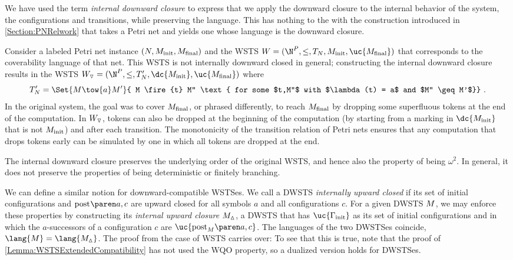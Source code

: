 \documentclass[../../diss.tex]{subfiles}
\begin{document}
\begin{remark*}
    We have used the term \emph{internal downward closure} to express that we apply the downward closure to the internal behavior of the system, \ie the configurations and transitions, while preserving the language.
    This has nothing to the with the construction introduced in \cref{Section:PNRelwork} that takes \eg a Petri net and yields one whose language is the downward closure.
\end{remark*}

\begin{example}
    Consider a labeled Petri net instance $(N,M_{\text{init}},M_{\text{final}})$ and the WSTS $\wsts = (\N^P,\leq,T_N,\Minit,\uc{\Mfinal})$ that corresponds to the coverability language of that net.
    This WSTS is not internally downward closed in general; constructing the internal downward closure results in the WSTS $\idc{\wsts} = (\N^P,\leq,T_N',\dc{\Minit},\uc{\Mfinal})$
    where
    \[
        T_N' = \Set{ M \tow{a} M'}{ M \fire{t} M'' \text{ for some $t,M''$ with $\lambda(t) = a$ and $M'' \geq M'$}}
        \ .
    \]
    In the original system, the goal was to cover $M_{\text{final}}$, or phrased differently, to reach $M_{\text{final}}$ by dropping some superfluous tokens at the end of the computation.
    In $W_{\scriptstyle{\triangledown}}$, tokens can also be dropped at the beginning of the computation (by starting from a marking in $\dc{\Minit}$ that is not $M_{\text{init}}$) and after each transition.
    The monotonicity of the transition relation of Petri nets ensures that any computation that drops tokens early can be simulated by one in which all tokens are dropped at the end.
\end{example}

The internal downward closure preserves the underlying order of the original WSTS, and hence also the property of being $\omega^2$.
In general, it does not preserve the properties of being deterministic or finitely branching.

We can define a similar notion for downward-compatible WSTSes.
We call a DWSTS \emph{internally upward closed} if its set of initial configurations and $\post{}{a}{c}$ are upward closed for all symbols $a$ and all configurations $c$.
For a given DWSTS $M$, we may enforce these properties by constructing its \emph{internal upward closure} $M_{\scriptstyle{\vartriangle}}$, a DWSTS that has $\uc{\configs_\init}$ as its set of initial configurations and in which the $a$-successors of a configuration $c$ are $\uc{\post{\dwsts}{a}{c}}$.
The languages of the two DWSTSes coincide, $\lang{\dwsts} = \lang{\iuc{\dwsts}}$.
The proof from the case of WSTS carries over:
To see that this is true, note that the proof of \cref{Lemma:WSTSExtendedCompatibility} has not used the WQO property, so a dualized version holds for DWSTSes.
\end{document}
